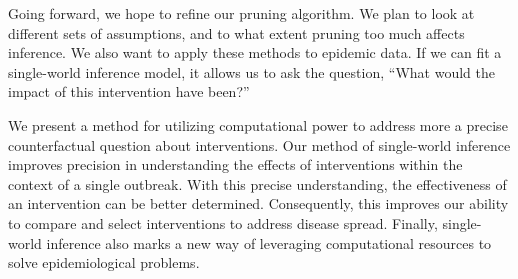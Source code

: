 \documentclass[openacc]{rsproca_new}%
\begin{document}
Going forward, we hope to refine our pruning algorithm.
We plan to look at different sets of assumptions, and to what extent pruning too much affects inference.
We also want to apply these methods to epidemic data.
If we can fit a single-world inference model, it allows us to ask the question, ``What would the impact of this intervention have been?''

We present a method for utilizing computational power to address more a precise counterfactual question about interventions.
Our method of single-world inference improves precision in understanding the effects of interventions within the context of a single outbreak.
With this precise understanding, the effectiveness of an intervention can be better determined.
Consequently, this improves our ability to compare and select interventions to address disease spread.
Finally, single-world inference also marks a new way of leveraging computational resources to solve epidemiological problems.


\enlargethispage{20pt}











\end{document}
